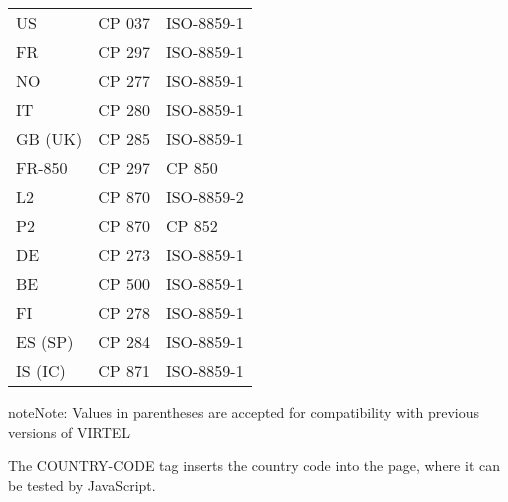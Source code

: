 \documentclass[letterpaper,10pt,english]{sphinxmanual}
\begin{document}
\begin{savenotes}\sphinxattablestart
\centering
\begin{tabulary}{\linewidth}[t]{|T|T|T|}
\hline
{}\relax &\relax &\relax \\
\hline
US
&
CP 037
&
ISO-8859-1
\\
\hline
FR
&
CP 297
&
ISO-8859-1
\\
\hline
NO
&
CP 277
&
ISO-8859-1
\\
\hline
IT
&
CP 280
&
ISO-8859-1
\\
\hline
GB (UK)
&
CP 285
&
ISO-8859-1
\\
\hline
FR-850
&
CP 297
&
CP 850
\\
\hline
L2
&
CP 870
&
ISO-8859-2
\\
\hline
P2
&
CP 870
&
CP 852
\\
\hline
DE
&
CP 273
&
ISO-8859-1
\\
\hline
BE
&
CP 500
&
ISO-8859-1
\\
\hline
FI
&
CP 278
&
ISO-8859-1
\\
\hline
ES (SP)
&
CP 284
&
ISO-8859-1
\\
\hline
IS (IC)
&
CP 871
&
ISO-8859-1
\\
\hline
\end{tabulary}
\par
\sphinxattableend\end{savenotes}


\begin{sphinxadmonition}{note}{Note:}
Values in parentheses are accepted for compatibility with previous versions of VIRTEL
\end{sphinxadmonition}


\begin{sphinxVerbatim}[commandchars=\\\{\}]
\end{sphinxVerbatim}

The COUNTRY-CODE tag inserts the country code into the page, where it can be tested by JavaScript.
\end{document}
